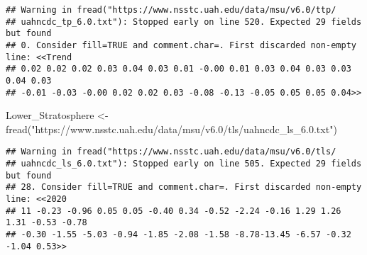 \documentclass[
]{article}
\newenvironment{Shaded}{\begin{snugshade}}{\end{snugshade}}
\newcommand{\FunctionTok}[1]{\textcolor[rgb]{0.00,0.00,0.00}{#1}}
\newcommand{\NormalTok}[1]{#1}
\newcommand{\OtherTok}[1]{\textcolor[rgb]{0.56,0.35,0.01}{#1}}
\newcommand{\StringTok}[1]{\textcolor[rgb]{0.31,0.60,0.02}{#1}}
\begin{document}
\begin{verbatim}
## Warning in fread("https://www.nsstc.uah.edu/data/msu/v6.0/ttp/
## uahncdc_tp_6.0.txt"): Stopped early on line 520. Expected 29 fields but found
## 0. Consider fill=TRUE and comment.char=. First discarded non-empty line: <<Trend
## 0.02 0.02 0.02 0.03 0.04 0.03 0.01 -0.00 0.01 0.03 0.04 0.03 0.03 0.04 0.03
## -0.01 -0.03 -0.00 0.02 0.02 0.03 -0.08 -0.13 -0.05 0.05 0.05 0.04>>
\end{verbatim}

\begin{Shaded}
\begin{Highlighting}[]
\NormalTok{Lower\_Stratosphere }\OtherTok{\textless{}{-}} \FunctionTok{fread}\NormalTok{(}\StringTok{"https://www.nsstc.uah.edu/data/msu/v6.0/tls/uahncdc\_ls\_6.0.txt"}\NormalTok{)}
\end{Highlighting}
\end{Shaded}

\begin{verbatim}
## Warning in fread("https://www.nsstc.uah.edu/data/msu/v6.0/tls/
## uahncdc_ls_6.0.txt"): Stopped early on line 505. Expected 29 fields but found
## 28. Consider fill=TRUE and comment.char=. First discarded non-empty line: <<2020
## 11 -0.23 -0.96 0.05 0.05 -0.40 0.34 -0.52 -2.24 -0.16 1.29 1.26 1.31 -0.53 -0.78
## -0.30 -1.55 -5.03 -0.94 -1.85 -2.08 -1.58 -8.78-13.45 -6.57 -0.32 -1.04 0.53>>
\end{verbatim}
\end{document}
